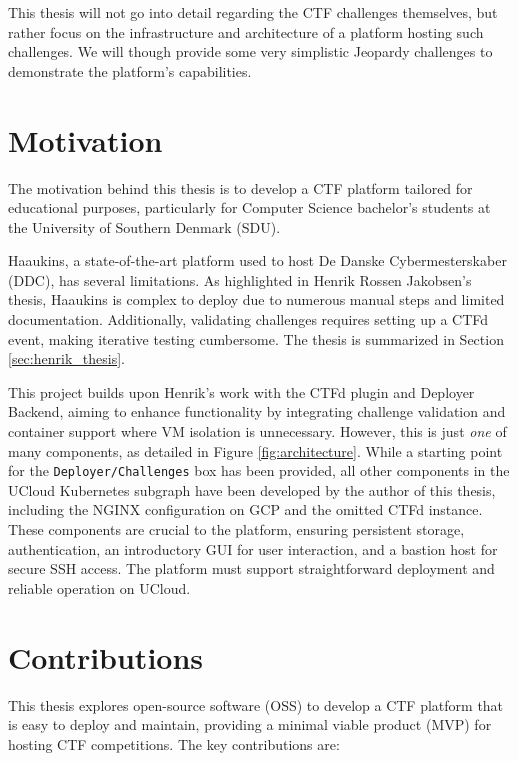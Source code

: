 This thesis will not go into detail regarding the CTF challenges themselves, but rather focus on the infrastructure and architecture of a platform hosting such challenges. We will though provide some very simplistic Jeopardy challenges to demonstrate the platform's capabilities.

\section{Motivation}
The motivation behind this thesis is to develop a CTF platform tailored for educational purposes, particularly for Computer Science bachelor's students at the University of Southern Denmark (SDU).

Haaukins, a state-of-the-art platform used to host De Danske Cybermesterskaber (DDC), has several limitations. As highlighted in Henrik Rossen Jakobsen's thesis, Haaukins is complex to deploy due to numerous manual steps and limited documentation. Additionally, validating challenges requires setting up a CTFd event, making iterative testing cumbersome. The thesis is summarized in Section \ref{sec:henrik_thesis}.

This project builds upon Henrik's work with the CTFd plugin and Deployer Backend, aiming to enhance functionality by integrating challenge validation and container support where VM isolation is unnecessary. However, this is just \textit{one} of many components, as detailed in Figure \ref{fig:architecture}. While a starting point for the \texttt{Deployer/Challenges} box has been provided, all other components in the UCloud Kubernetes subgraph have been developed by the author of this thesis, including the NGINX configuration on GCP and the omitted CTFd instance. These components are crucial to the platform, ensuring persistent storage, authentication, an introductory GUI for user interaction, and a bastion host for secure SSH access. The platform must support straightforward deployment and reliable operation on UCloud.

\section{Contributions}
This thesis explores open-source software (OSS) to develop a CTF platform that is easy to deploy and maintain, providing a minimal viable product (MVP) for hosting CTF competitions. The key contributions are:

